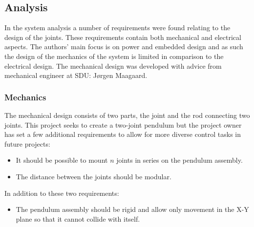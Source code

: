 \subsection{Analysis} %
\label{sub:analysis}

In the system analysis a number of requirements were found relating to the design of the joints.
These requirements contain both mechanical and electrical aspects.
The authors' main focus is on power and embedded design and as such the design of the mechanics of the system is limited in comparison to the electrical design.
The mechanical design was developed with advice from mechanical engineer at SDU: Jørgen Maagaard.

\subsubsection{Mechanics} %
\label{ssub:mechanics}
The mechanical design consists of two parts, the joint and the rod connecting two joints.
This project seeks to create a two-joint pendulum but the project owner has set a few additional requirements to allow for more diverse control tasks in future projects:
\begin{itemize}
	\item It should be possible to mount $n$ joints in series on the pendulum assembly.
	\item The distance between the joints should be modular.
\end{itemize}
In addition to these two requirements:
\begin{itemize}
	\item The pendulum assembly should be rigid and allow only movement in the X-Y plane so that it cannot collide with itself.
\end{itemize}

